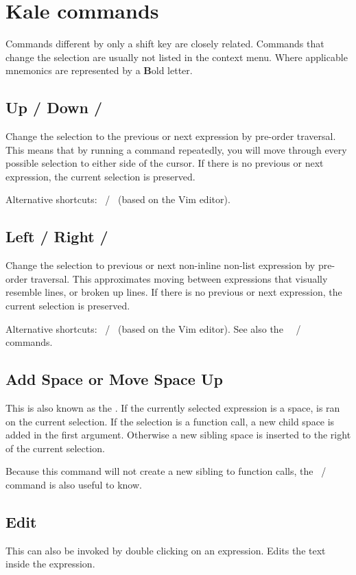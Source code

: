 \chapter{Kale commands}
\newcommand{\shortcut}[3]{\section[#1]{#1 \hfill #2}\label{cmd:#3}}
\newcommand{\pskip}[1]{{\bigskip\par\noindent #1}}

Commands different by only a shift key \keys{\shift} are closely
related. Commands that change the selection are usually not listed in the
context menu. Where applicable mnemonics are represented by a \textbf{B}old
letter.

\shortcut{Up / Down}{\ak{^} / }{up_down}
Change the selection to the previous or next expression by pre-order traversal.
This means that by running a command repeatedly, you will move through every
possible selection to either side of the cursor. If there is no previous or
next expression, the current selection is preserved.
\pskip{Alternative shortcuts: ~/~ (based on the Vim editor).}

\shortcut{Left / Right}{\ak{<} / \ak{>}}{left_right}
Change the selection to previous or next non-inline non-list expression by
pre-order traversal. This approximates moving between expressions that visually
resemble lines, or broken up lines. If there is no previous or next expression,
the current selection is preserved.
\pskip{%
Alternative shortcuts: ~/~ (based on the Vim editor).
See also the
\hyperref[cmd:left_right_sibling]{\say{Left / Right Sibling}}%
~{\keys{\shift + H}~/~\keys{\shift + L}}
commands.
}

\shortcut{Add Space or Move Space Up}{\keys{\SPACE}}{smart_space}
This is also known as the . If the currently selected
expression is a space, \hyperref[cmd:move_up]{} is ran on the
current selection. If the selection is a function call, a new child space
is added in the first argument. Otherwise a new sibling space is inserted to
the right of the current selection. 

Because this command will not create a new sibling to function calls, the 
\hyperref[cmd:new_line]{}
~/~ 
command is also useful to know.

\shortcut{Edit}{\keys{\return}}{edit}
This can also be invoked by double clicking on an expression. Edits the text
inside the expression.

